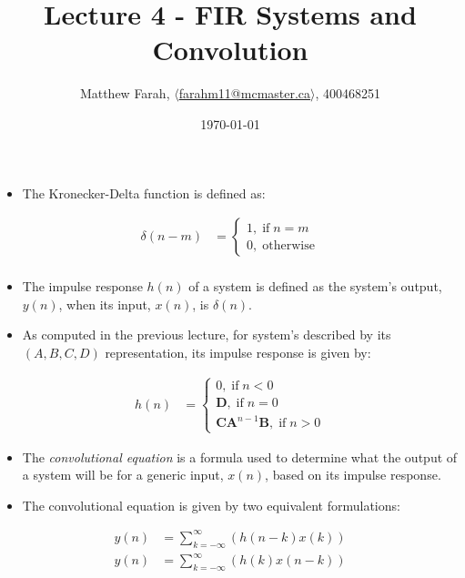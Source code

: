 \documentclass{article}
\title{Lecture 4 - FIR Systems and Convolution}
\author{Matthew Farah, \href{mailto:farahm11@mcmaster.ca}{$\langle$farahm11@mcmaster.ca$\rangle$}, 400468251}
\date{\today}
\begin{document}
\maketitle
\pagestyle{fancy}

\begin{itemize}
	\item The Kronecker-Delta function is defined as:
\end{itemize}

\begin{align*}
	\delta(n - m) &= \begin{cases} 1, \; \text{if} \; n = m \\ 0, \; \text{otherwise} \end{cases} \\
\end{align*}

\begin{itemize}
	\item The impulse response $h(n)$ of a system is defined as the system's output, $y(n)$, when its input, $x(n)$, is $\delta(n)$.
	\item As computed in the previous lecture, for system's described by its $\left( A, B, C, D \right)$ representation, its impulse response is given by:
\end{itemize}

\begin{align*}
	h(n) &= \begin{cases} 0, \; \text{if} \; n < 0 \\ \bm{D}, \; \text{if} \; n = 0 \\ \bm{C}\bm{A}^{n - 1}\bm{B}, \; \text{if} \; n > 0 \end{cases}
\end{align*}

\begin{itemize}
	\item The \emph{convolutional equation} is a formula used to determine what the output of a system will be for a generic input, $x(n)$, based on its impulse response.
	\item The convolutional equation is given by two equivalent formulations:
\end{itemize}

\begin{align*}
	y(n) &= \sum_{k = -\infty}^{\infty}(h(n - k)x(k)) \\
	y(n) &= \sum_{k = -\infty}^{\infty}(h(k)x(n - k)) \\
\end{align*}
\end{document}
